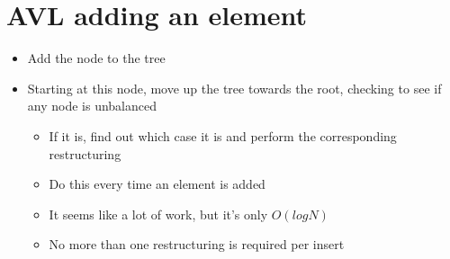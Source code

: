 \documentclass{article}
\begin{document}
\section{AVL adding an element}
\begin{itemize}
  \item{Add the node to the tree}
  \item{Starting at this node, move up the tree towards the root, checking to see if any node is unbalanced}
  \begin{itemize}
    \item{If it is, find out which case it is and perform the corresponding restructuring}
    \item{Do this every time an element is added}
    \item{It seems like a lot of work, but it's only $O(logN)$}
    \item{No more than one restructuring is required per insert}
  \end{itemize}
\end{itemize}

\begin{lstlisting}[language=Python, frame=single]
\end{lstlisting}
\end{document}
